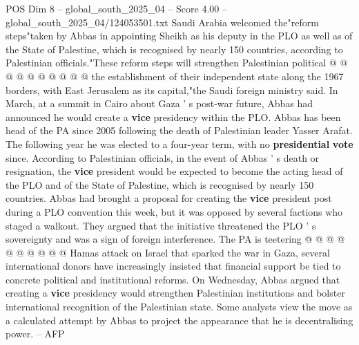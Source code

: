 \begin{textsample}{POS Dim 8 – global\_south\_2025\_04 – Score 4.00 – global\_south\_2025\_04/124053501.txt}
Saudi Arabia welcomed the"reform steps"taken by Abbas in appointing Sheikh as his deputy in the PLO as well as of the State of Palestine, which is recognised by nearly 150 countries, according to Palestinian officials."These reform steps will strengthen Palestinian political @ @ @ @ @ @ @ @ @ @ the establishment of their independent state along the 1967 borders, with East Jerusalem as its capital,"the Saudi foreign ministry said.
In March, at a summit in Cairo about Gaza ' s post-war future, Abbas had announced he would create a \textbf{vice} presidency within the PLO.
Abbas has been head of the PA since 2005 following the death of Palestinian leader Yasser Arafat.
The following year he was elected to a four-year term, with no \textbf{presidential} \textbf{vote} since.
According to Palestinian officials, in the event of Abbas ' s death or resignation, the \textbf{vice} president would be expected to become the acting head of the PLO and of the State of Palestine, which is recognised by nearly 150 countries.
Abbas had brought a proposal for creating the \textbf{vice} president post during a PLO convention this week, but it was opposed by several factions who staged a walkout.
They argued that the initiative threatened the PLO ' s sovereignty and was a sign of foreign interference.
The PA is teetering @ @ @ @ @ @ @ @ @ @ Hamas attack on Israel that sparked the war in Gaza, several international donors have increasingly insisted that financial support be tied to concrete political and institutional reforms.
On Wednesday, Abbas argued that creating a \textbf{vice} presidency would strengthen Palestinian institutions and bolster international recognition of the Palestinian state.
Some analysts view the move as a calculated attempt by Abbas to project the appearance that he is decentralising power. -- AFP

\end{textsample}
